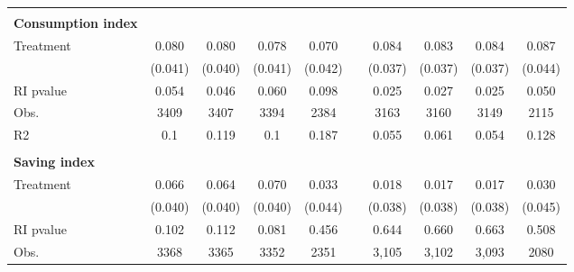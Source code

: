 \documentclass[
	article,			%
	12pt,				%
	oneside,			%
	a4paper,			%
	]{article}
\begin{document}
\begin{landscape}
\begin{table}[ht]
\begin{threeparttable}
\begin{tabular}{lccccccccc}
           &            &            &            &            &            &            &            &            &            \\

{\bf Consumption index} &            &            &            &            &            &            &            &            &            \\

 Treatment &     0.080 &    0.080 &     0.078 &     0.070 &            &    0.084 &    0.083 &    0.084 &     0.087 \\

           &    (0.041) &    (0.040) &    (0.041) &    (0.042) &            &    (0.037) &    (0.037) &    (0.037) &    (0.044) \\

    RI pvalue &      0.054 &      0.046 &      0.060 &      0.098 &            &      0.025 &      0.027 &      0.025 &      0.050 \\

      Obs. &       3409 &       3407 &       3394 &       2384 &            &       3163 &       3160 &       3149 &       2115 \\

        R2 &        0.1 &      0.119 &        0.1 &      0.187 &            &      0.055 &      0.061 &      0.054 &      0.128 \\

           &            &            &            &            &            &            &            &            &            \\

{\bf Saving index} &            &            &            &            &            &            &            &            &            \\

 Treatment &      0.066 &      0.064 &     0.070 &      0.033 &            &      0.018 &      0.017 &      0.017 &      0.030 \\

           &    (0.040) &    (0.040) &    (0.040) &    (0.044) &            &    (0.038) &    (0.038) &    (0.038) &    (0.045) \\

    RI pvalue &      0.102 &      0.112 &      0.081 &      0.456 &            &      0.644 &      0.660 &      0.663 &      0.508 \\

      Obs. &       3368 &       3365 &       3352 &       2351 &            &      3,105 &      3,102 &      3,093 &       2080 \\


\end{tabular}
\end{threeparttable}
\end{table}
\end{landscape}
\end{document}
